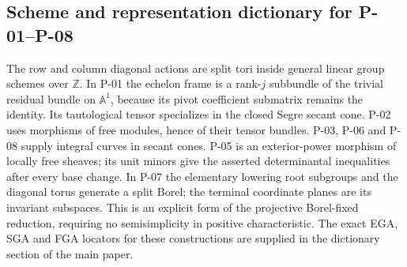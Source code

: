 \subsection*{Scheme and representation dictionary for P-01--P-08}
The row and column diagonal actions are split tori inside
general linear group schemes over \(\mathbb Z\). In P-01 the
echelon frame is a rank-\(j\) subbundle of the trivial residual
bundle on \(\mathbb A^1\), because its pivot coefficient
submatrix remains the identity. Its tautological tensor
specializes in the closed Segre secant cone.
P-02 uses morphisms of free modules, hence of their tensor
bundles. P-03, P-06 and P-08 supply integral curves in
secant cones. P-05 is an exterior-power morphism of locally
free sheaves; its unit minors give the asserted
determinantal inequalities after every base change.
In P-07 the elementary lowering root subgroups and the
diagonal torus generate a split Borel; the terminal
coordinate planes are its invariant subspaces.
This is an explicit form of the projective Borel-fixed
reduction, requiring no semisimplicity in positive
characteristic. The exact EGA, SGA and FGA locators for
these constructions are supplied in the dictionary
section of the main paper.
